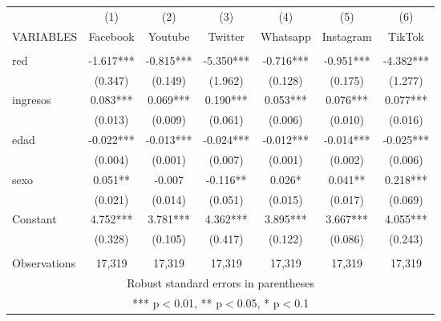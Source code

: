 \begin{tabular}{lcccccc} \hline
 & (1) & (2) & (3) & (4) & (5) & (6) \\
VARIABLES & Facebook & Youtube & Twitter & Whatsapp & Instagram & TikTok \\ \hline
 &  &  &  &  &  &  \\
red & -1.617*** & -0.815*** & -5.350*** & -0.716*** & -0.951*** & -4.382*** \\
 & (0.347) & (0.149) & (1.962) & (0.128) & (0.175) & (1.277) \\
ingresos & 0.083*** & 0.069*** & 0.190*** & 0.053*** & 0.076*** & 0.077*** \\
 & (0.013) & (0.009) & (0.061) & (0.006) & (0.010) & (0.016) \\
edad & -0.022*** & -0.013*** & -0.024*** & -0.012*** & -0.014*** & -0.025*** \\
 & (0.004) & (0.001) & (0.007) & (0.001) & (0.002) & (0.006) \\
sexo & 0.051** & -0.007 & -0.116** & 0.026* & 0.041** & 0.218*** \\
 & (0.021) & (0.014) & (0.051) & (0.015) & (0.017) & (0.069) \\
Constant & 4.752*** & 3.781*** & 4.362*** & 3.895*** & 3.667*** & 4.055*** \\
 & (0.328) & (0.105) & (0.417) & (0.122) & (0.086) & (0.243) \\
 &  &  &  &  &  &  \\
 Observations & 17,319 & 17,319 & 17,319 & 17,319 & 17,319 & 17,319 \\ \hline
\multicolumn{7}{c}{ Robust standard errors in parentheses} \\
\multicolumn{7}{c}{ *** p$<$0.01, ** p$<$0.05, * p$<$0.1} \\
\end{tabular}
